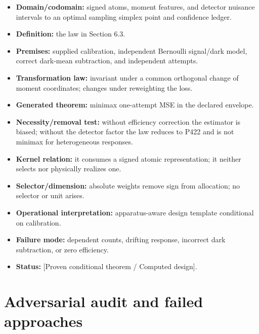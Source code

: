 \documentclass[11pt,a4paper,openany]{report}
\begin{document}
\begin{itemize}
\item 
\textbf{Domain/\allowbreak{}codomain:} signed atoms, moment features, and detector nuisance intervals to an optimal sampling simplex point and confidence ledger.

\item 
\textbf{Definition:} the law in Section 6.3.

\item 
\textbf{Premises:} supplied calibration, independent Bernoulli signal/\allowbreak{}dark model, correct dark-mean subtraction, and independent attempts.

\item 
\textbf{Transformation law:} invariant under a common orthogonal change of moment coordinates; changes under reweighting the loss.

\item 
\textbf{Generated theorem:} minimax one-attempt MSE in the declared envelope.

\item 
\textbf{Necessity/\allowbreak{}removal test:} without efficiency correction the estimator is biased; without the detector factor the law reduces to P422 and is not minimax for heterogeneous responses.

\item 
\textbf{Kernel relation:} it consumes a signed atomic representation; it neither selects nor physically realizes one.

\item 
\textbf{Selector/\allowbreak{}dimension:} absolute weights remove sign from allocation; no selector or unit arises.

\item 
\textbf{Operational interpretation:} apparatus-aware design template conditional on calibration.

\item 
\textbf{Failure mode:} dependent counts, drifting response, incorrect dark subtraction, or zero efficiency.

\item 
\textbf{Status:} [Proven conditional theorem /\allowbreak{} Computed design].

\end{itemize}

\chapter{Adversarial audit and failed approaches}
\end{document}
